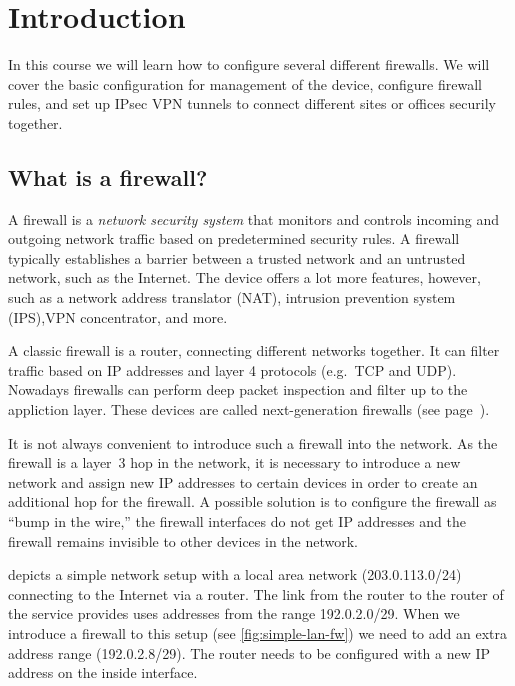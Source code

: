 \chapter{Introduction}
\label{chap:introduction}

In this course we will learn how to configure several different firewalls.
We will cover the basic configuration for management of the device, configure firewall rules, and set up IPsec VPN tunnels to connect different sites or offices securily together.



\section{What is a firewall?}
A firewall is a \emph{network security system} that monitors and controls incoming and outgoing network traffic based on predetermined security rules.
A firewall typically establishes a barrier between a trusted network and an untrusted network, such as the Internet.
The device offers a lot more features, however, such as a network address translator (NAT), intrusion prevention system (IPS),VPN concentrator, and more.

A classic firewall is a router, connecting different networks together.
It can filter traffic based on IP addresses and layer 4 protocols (e.g.\ TCP and UDP).
Nowadays firewalls can perform deep packet inspection and filter up to the appliction layer.
These devices are called next-generation firewalls (see page~\pageref{sec:intro-ngfw}).

It is not always convenient to introduce such a firewall into the network.
As the firewall is a layer~3 hop in the network, it is necessary to introduce a new network and assign new IP addresses to certain devices in order to create an additional hop for the firewall.
A possible solution is to configure the firewall as ``bump in the wire,'' the firewall interfaces do not get IP addresses and the firewall remains invisible to other devices in the network.

 depicts a simple network setup with a local area network (203.0.113.0/24) connecting to the Internet via a router.
The link from the router to the router of the service provides uses addresses from the range 192.0.2.0/29.
When we introduce a firewall to this setup (see \cref{fig:simple-lan-fw}) we need to add an extra address range (192.0.2.8/29).
The router needs to be configured with a new IP address on the inside interface.


